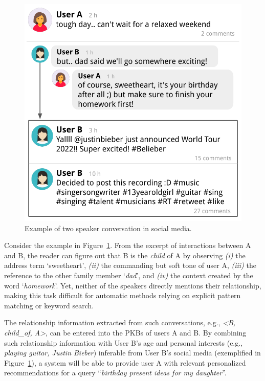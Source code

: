 \begin{figure}[t!]
\centering
\begin{adjustbox}{width=0.46\textwidth}
\includegraphics{imgs/conversation_example}
\end{adjustbox}
\caption{Example of two speaker
conversation in social media.}
\label{example_conv}
\end{figure}

Consider the example in Figure~\ref{example_conv}.
From the excerpt of interactions between A and B, the reader can figure out that B is the \textit{child} of A by observing \textit{(i)} the address term `sweetheart', \textit{(ii)} the commanding but soft tone of user A, \textit{(iii)} the reference to the other family member `\textit{dad}', and \textit{(iv)} the context created by the word `\textit{homework}'. Yet, neither of the speakers directly mentions their relationship, making this task difficult for automatic methods 
relying on explicit pattern matching or keyword search.

The relationship information extracted from such conversations, e.g., \textit{<B, child\_of, A>}, can be entered into the PKBs of users A and B. By combining such relationship information with User B's age and personal interests (e.g., \emph{playing guitar, Justin Bieber}) inferable from User B's social media (exemplified in Figure~\ref{example_conv}), 
a system will be able to provide
user A with relevant personalized recommendations for a query ``\textit{birthday present ideas for my daughter}''. 

